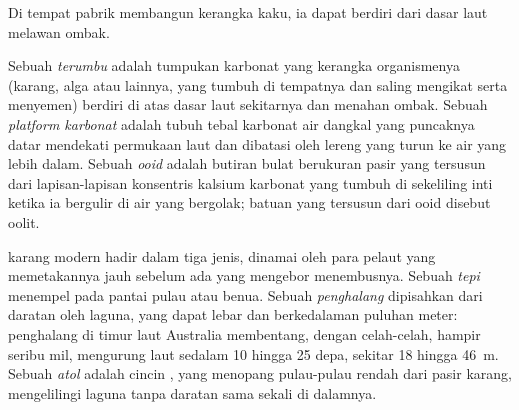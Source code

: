Di tempat pabrik membangun kerangka kaku, ia dapat berdiri dari dasar laut melawan ombak.

\begin{definition}\label{def:b1:chemical-biogenic-sediments:reef}
Sebuah \emph{terumbu} adalah tumpukan karbonat yang kerangka organismenya (karang, alga atau lainnya, yang tumbuh di tempatnya dan saling mengikat serta menyemen) berdiri di atas dasar laut sekitarnya dan menahan ombak. Sebuah \emph{platform karbonat} adalah tubuh tebal karbonat air dangkal yang puncaknya datar mendekati permukaan laut dan dibatasi oleh lereng yang turun ke air yang lebih dalam. Sebuah \emph{ooid} adalah butiran bulat berukuran pasir yang tersusun dari lapisan-lapisan konsentris kalsium karbonat yang tumbuh di sekeliling inti ketika ia bergulir di air yang bergolak; batuan yang tersusun dari ooid disebut oolit.
\end{definition}

 karang modern hadir dalam tiga jenis, dinamai oleh para pelaut yang memetakannya jauh sebelum ada yang mengebor menembusnya. Sebuah  \emph{tepi} menempel pada pantai pulau atau benua. Sebuah  \emph{penghalang} dipisahkan dari daratan oleh laguna, yang dapat lebar dan berkedalaman puluhan meter: penghalang di timur laut Australia membentang, dengan celah-celah, hampir seribu mil, mengurung laut sedalam 10 hingga 25 depa, sekitar 18 hingga \qty{46}{m}. Sebuah \emph{atol} adalah cincin , yang menopang pulau-pulau rendah dari pasir karang, mengelilingi laguna tanpa daratan sama sekali di dalamnya.

